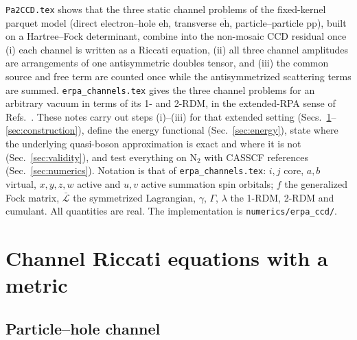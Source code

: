 \documentclass[aip,jcp,reprint,noshowkeys,superscriptaddress]{revtex4-1}
\newcommand{\eh}{\text{eh}}
\newcommand{\teh}{\overline{\text{eh}}}
\newcommand{\pp}{\text{pp}}
\newcommand{\sLag}{\bar{\mathcal L}}
\begin{document}
\texttt{Pa2CCD.tex} shows that the three static channel problems of the
fixed-kernel parquet model (direct electron--hole $\eh$, transverse $\teh$,
particle--particle $\pp$), built on a Hartree--Fock determinant, combine into
the non-mosaic CCD residual once (i) each channel is written as a Riccati
equation, (ii) all three channel amplitudes are arrangements of one
antisymmetric doubles tensor, and (iii) the common source and free term are
counted once while the antisymmetrized scattering terms are summed.
\texttt{erpa\_channels.tex} gives the three channel problems for an arbitrary
vacuum in terms of its 1- and 2-RDM, in the extended-RPA sense of
Refs.~\cite{Rowe1968,ChatterjeePernal2012}.  These notes carry out steps (i)--(iii)
for that extended setting (Secs.~\ref{sec:riccati}--\ref{sec:construction}),
define the energy functional (Sec.~\ref{sec:energy}), state where the
underlying quasi-boson approximation is exact and where it is not
(Sec.~\ref{sec:validity}), and test everything on N$_2$ with CASSCF
references (Sec.~\ref{sec:numerics}).  Notation is that of
\texttt{erpa\_channels.tex}: $i,j$ core, $a,b$ virtual, $x,y,z,w$ active and
$u,v$ active summation spin orbitals; $f$ the generalized Fock matrix, $\sLag$
the symmetrized Lagrangian, $\gamma$, $\Gamma$, $\lambda$ the 1-RDM, 2-RDM
and cumulant.  All quantities are real.  The implementation is
\texttt{numerics/erpa\_ccd/}.

\section{Channel Riccati equations with a metric}
\label{sec:riccati}

\subsection{Particle--hole channel}
\end{document}
